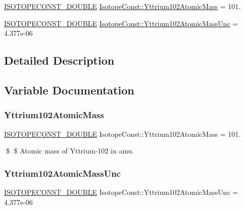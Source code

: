 \begin{DoxyCompactItemize}
\item 
\mbox{\hyperlink{group___isotope_const-_macros_ga8f45a7272ce02c0b4c65c44636ed719a}{I\+S\+O\+T\+O\+P\+E\+C\+O\+N\+S\+T\+\_\+\+D\+O\+U\+B\+LE}} \mbox{\hyperlink{group___isotope_const-_yttrium-_y102_ga188c5a1f49157fc8419b75326ad5ba6c}{Isotope\+Const\+::\+Yttrium102\+Atomic\+Mass}} = 101.
\item 
\mbox{\hyperlink{group___isotope_const-_macros_ga8f45a7272ce02c0b4c65c44636ed719a}{I\+S\+O\+T\+O\+P\+E\+C\+O\+N\+S\+T\+\_\+\+D\+O\+U\+B\+LE}} \mbox{\hyperlink{group___isotope_const-_yttrium-_y102_gaa43b91f1a34aea9ceccd95cdaf55c497}{Isotope\+Const\+::\+Yttrium102\+Atomic\+Mass\+Unc}} = 4.\+377e-\/06
\end{DoxyCompactItemize}


\subsection{Detailed Description}


\subsection{Variable Documentation}
\mbox{\label{group___isotope_const-_yttrium-_y102_ga188c5a1f49157fc8419b75326ad5ba6c}} 
\subsubsection{\texorpdfstring{Yttrium102\+Atomic\+Mass}{Yttrium102AtomicMass}}
{\footnotesize\ttfamily \mbox{\hyperlink{group___isotope_const-_macros_ga8f45a7272ce02c0b4c65c44636ed719a}{I\+S\+O\+T\+O\+P\+E\+C\+O\+N\+S\+T\+\_\+\+D\+O\+U\+B\+LE}} Isotope\+Const\+::\+Yttrium102\+Atomic\+Mass = 101.}

\$ \$ Atomic mass of Yttrium-\/102 in amu. \mbox{\label{group___isotope_const-_yttrium-_y102_gaa43b91f1a34aea9ceccd95cdaf55c497}} 
\subsubsection{\texorpdfstring{Yttrium102\+Atomic\+Mass\+Unc}{Yttrium102AtomicMassUnc}}
{\footnotesize\ttfamily \mbox{\hyperlink{group___isotope_const-_macros_ga8f45a7272ce02c0b4c65c44636ed719a}{I\+S\+O\+T\+O\+P\+E\+C\+O\+N\+S\+T\+\_\+\+D\+O\+U\+B\+LE}} Isotope\+Const\+::\+Yttrium102\+Atomic\+Mass\+Unc = 4.\+377e-\/06}

